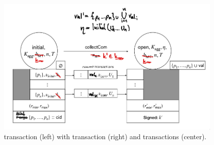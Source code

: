 \begin{figure}[h]

  \centering

  \includegraphics[width=\textwidth/2]{figures/SM_initial_open.png}

  \caption{\mtxInit{} transaction (left) with \mtxCCom{} transaction
    (right) and \mtxCom{} transactions (center).}
  \label{fig:SM_initial_open}

\end{figure}



